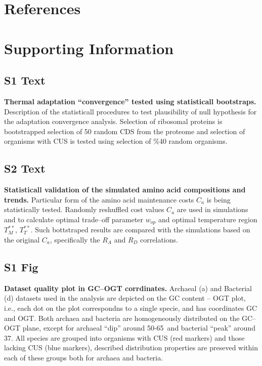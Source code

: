 \documentclass[10pt,letterpaper]{article}
\begin{document}
\section*{References}
%
%
% 




\section*{Supporting Information}

\subsection*{S1 Text}
\label{text:s1}
{\bf Thermal adaptation ``convergence'' tested using statisticall bootstraps.}
Description of the statisticall procedures to test plausibility of null hypothesis for the adaptation convergence analysis. Selection of ribosomal proteins is bootstrapped selection of 50 random CDS from the proteome and selection of organisms with CUS is tested using selection of \%40 random organisms.


\subsection*{S2 Text}
\label{text:s2}
{\bf Statisticall validation of the simulated amino acid compositions and trends.}
Particular form of the amino acid maintenance costs $C_{a}$ is being statistically tested.
Randomly reshuffled cost values $C_{a}$ are used in simulations and to calculate optimal trade--off parameter $w_{op}$ and optimal temperature region $T^{**}_M$, $T^{**}_T$. Such bottstraped results are compared with the simulations based on the original $C_{a}$, specifically the $R_A$ and $R_D$ correlations.



\subsection*{S1 Fig}
\label{fig:s1}
{\bf Dataset quality plot in GC--OGT corrdinates.}
Archaeal (a) and Bacterial (d) datasets used in the analysis are depicted on the GC content -- OGT plot, i.e., each dot on the plot correspondns to a single specie, and has coordinates GC and OGT. Both archaea and bacteria are homogeneously distributed on the GC--OGT plane, except for archaeal ``dip'' around 50-65\textcelsius\  and bacterial ``peak'' around 37\textcelsius. All species are grouped into organisms with CUS (red markers) and those lacking CUS (blue markers), described distribution properties are preseved within each of these groups both for archaea and bacteria.
\end{document}
